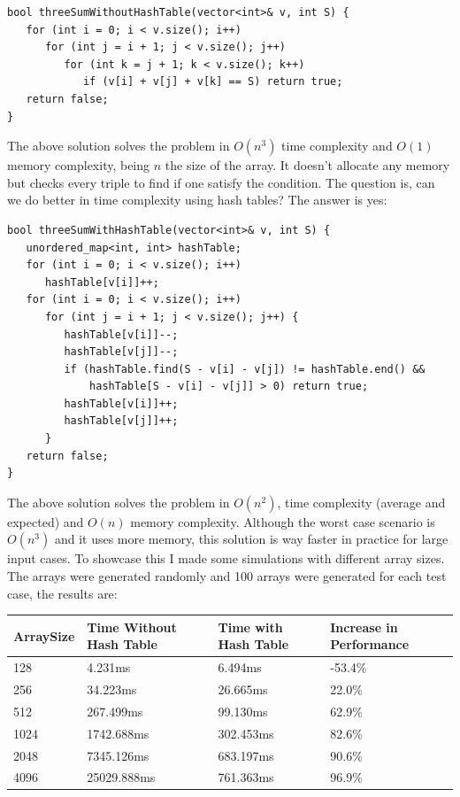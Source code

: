 \begin{lstlisting}
bool threeSumWithoutHashTable(vector<int>& v, int S) {
   for (int i = 0; i < v.size(); i++)
      for (int j = i + 1; j < v.size(); j++)
         for (int k = j + 1; k < v.size(); k++)
            if (v[i] + v[j] + v[k] == S) return true;
   return false;
}
\end{lstlisting}

\medskip

The above solution solves the problem in \( O(n^3) \) time complexity and \( O(1) \) memory complexity, being \( n \) the size of the array. It doesn't allocate any memory but checks every triple to find if one satisfy the condition. The question is, can we do better in time complexity using hash tables? The answer is yes:

\medskip

\begin{lstlisting}
bool threeSumWithHashTable(vector<int>& v, int S) {
   unordered_map<int, int> hashTable; 
   for (int i = 0; i < v.size(); i++)
      hashTable[v[i]]++;
   for (int i = 0; i < v.size(); i++)
      for (int j = i + 1; j < v.size(); j++) {
         hashTable[v[i]]--;
         hashTable[v[j]]--;         
         if (hashTable.find(S - v[i] - v[j]) != hashTable.end() &&
             hashTable[S - v[i] - v[j]] > 0) return true;
         hashTable[v[i]]++;
         hashTable[v[j]]++;
      }
   return false;
}
\end{lstlisting}

\medskip

The above solution solves the problem in \( O(n^2) \), time complexity (average and expected) and \( O(n) \) memory complexity. Although the worst case scenario is \( O(n^3) \) and it uses more memory, this solution is way faster in practice for large input cases. To showcase this I made some simulations with different array sizes. The arrays were generated randomly and 100 arrays were generated for each test case, the results are: \\

\bigskip

\begin{tabular}{|l|l|l|l|}
  \hline
  ArraySize & Time Without Hash Table & Time with Hash Table & Increase in Performance \\
  \hline
  128       & 4.231ms                 & 6.494ms              & -53.4\%                  \\
  \hline
  256       & 34.223ms                & 26.665ms             & 22.0\%                   \\
  \hline
  512       & 267.499ms               & 99.130ms             & 62.9\%                   \\
  \hline
  1024      & 1742.688ms              & 302.453ms            & 82.6\%                   \\
  \hline
  2048      & 7345.126ms              & 683.197ms            & 90.6\%                   \\
  \hline
  4096      & 25029.888ms             & 761.363ms            & 96.9\%                   \\
  \hline
\end{tabular}

